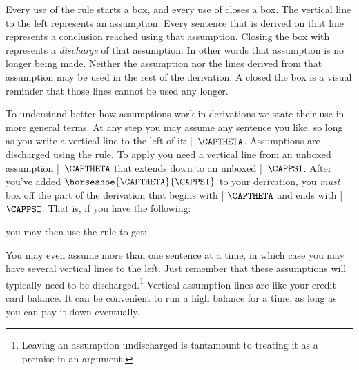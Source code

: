 Every use of the  rule starts a box, and every use of  closes a box.
The vertical line to the left represents an assumption.
Every sentence that is derived on that line represents a conclusion reached using that assumption.
Closing the box with  represents a \emph{discharge} of that assumption.
In other words that assumption is no longer being made.
Neither the assumption nor the lines derived from that assumption may be used in the rest of the derivation.
A closed the box is a visual reminder that those lines cannot be used any longer.

To understand better how assumptions work in derivations we state their use in more general terms.
At any step you may assume any sentence you like, so long as you write a vertical line to the left of it: \mbox{| $\CAPTHETA$}.
Assumptions are discharged using the  rule.
To apply  you need a vertical line from an unboxed assumption \mbox{| $\CAPTHETA$} that extends down to an unboxed \mbox{| $\CAPPSI$}. 
After you've added $\horseshoe{\CAPTHETA}{\CAPPSI}$ to your derivation, you \emph{must} box off the part of the derivation that begins with | $\CAPTHETA$ and ends with | $\CAPPSI$.
That is, if you have the following:

\begin{gproofnn}[\label{conditionalintro}]
\end{gproofnn}

\noindent{}you may then use the rule  to get:

\begin{gproofnn}[\label{conditionalintroclosed}]
\end{gproofnn}

\noindent{}You may even assume more than one sentence at a time, in which case you may have several vertical lines to the left.
Just remember that these assumptions will typically need to be discharged.\footnote{Leaving an assumption undischarged is tantamount to treating it as a premise in an argument.}
Vertical assumption lines are like your credit card balance.
It can be convenient to run a high balance for a time, as long as you can pay it down eventually.

